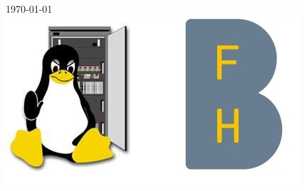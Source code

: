 \begin{titlepage}
		
		
		{\large \today}\\[2cm] %
		
		
		\includegraphics[scale=0.7]{tux-secure.jpg}\\[1cm] %
		
		
		\vfill %
	\end{titlepage}
